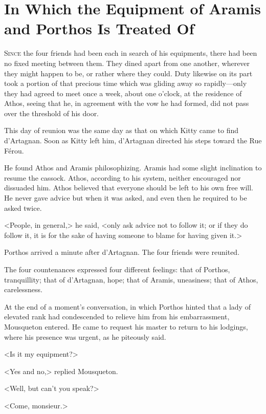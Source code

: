 
\chapter[The Equipment of Aramis and Porthos]{In Which the Equipment of Aramis and Porthos Is Treated Of}

\lettrine[]{S}{ince} the four friends had been each in search of his equipments, there had been no fixed meeting between them. They dined apart from one another, wherever they might happen to be, or rather where they could. Duty likewise on its part took a portion of that precious time which was gliding away so rapidly---only they had agreed to meet once a week, about one o'clock, at the residence of Athos, seeing that he, in agreement with the vow he had formed, did not pass over the threshold of his door. 

This day of reunion was the same day as that on which Kitty came to find d'Artagnan. Soon as Kitty left him, d'Artagnan directed his steps toward the Rue Férou. 

He found Athos and Aramis philosophizing. Aramis had some slight inclination to resume the cassock. Athos, according to his system, neither encouraged nor dissuaded him. Athos believed that everyone should be left to his own free will. He never gave advice but when it was asked, and even then he required to be asked twice. 

<People, in general,> he said, <only ask advice not to follow it; or if they do follow it, it is for the sake of having someone to blame for having given it.> 

Porthos arrived a minute after d'Artagnan. The four friends were reunited. 

The four countenances expressed four different feelings: that of Porthos, tranquillity; that of d'Artagnan, hope; that of Aramis, uneasiness; that of Athos, carelessness. 

At the end of a moment's conversation, in which Porthos hinted that a lady of elevated rank had condescended to relieve him from his embarrassment, Mousqueton entered. He came to request his master to return to his lodgings, where his presence was urgent, as he piteously said. 

<Is it my equipment?> 

<Yes and no,> replied Mousqueton. 

<Well, but can't you speak?> 

<Come, monsieur.> 


